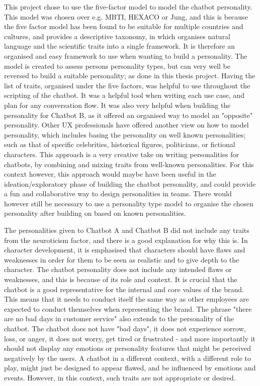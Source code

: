 This project chose to use the five-factor model to model the chatbot personality. This model was chosen over e.g. MBTI, HEXACO or Jung, and this is because the five factor model has been found to be suitable for multiple countries and cultures, and provides a descriptive taxonomy, in which organises natural language and the scientific traits into a single framework. It is therefore an organised and easy framework to use when wanting to build a personality. The model is created to assess persons personality types, but can very well be reversed to build a suitable personality; as done in this thesis project. Having the list of traits, organised under the five factors, was helpful to use throughout the scripting of the chatbot. It was a helpful tool when writing each use case, and plan for any conversation flow. It was also very helpful when building the personality for Chatbot B, as it offered an organised way to model an "opposite" personality. Other UX professionals have offered another view on how to model personality, which includes basing the personality on well known personalities; such as that of specific celebrities, historical figures, politicians, or fictional characters. This approach is a very creative take on writing personalities for chatbots, by combining and mixing traits from well-known personalities. For this context however, this approach would maybe have been useful in the ideation/exploratory phase of building the chatbot personality, and could provide a fun and collaborative way to design personalities in teams. There would however still be necessary to use a personality type model to organise the chosen personality after building on based on known personalities. 

The personalities given to Chatbot A and Chatbot B did not include any traits from the neuroticism factor, and there is a good explanation for why this is. In character development, it is emphasised that characters should have flaws and weaknesses in order for them to be seen as realistic and to give depth to the character. The chatbot personality does not include any intended flaws or weaknesses, and this is because of its role and context. It is crucial that the chatbot is a good representative for the internal and core values of the brand. This means that it needs to conduct itself the same way as other employees are expected to conduct themselves when representing the brand. The phrase "there are no bad days in customer service" also extends to the personality of the chatbot. The chatbot does not have "bad days", it does not experience sorrow, loss, or anger, it does not worry, get tired or frustrated - and more importantly it should not display any emotions or personality features that might be perceived negatively by the users. A chatbot in a different context, with a different role to play, might just be designed to appear flawed, and be influenced by emotions and events. However, in this context, such traits are not appropriate or desired.

